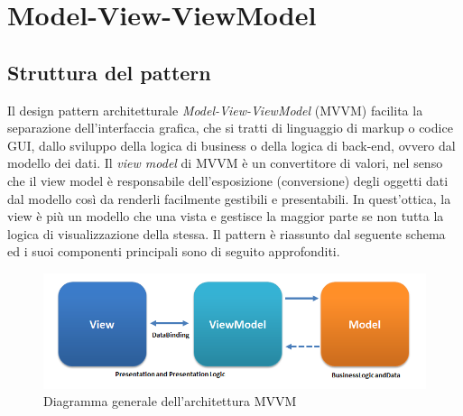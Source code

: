 \documentclass[openany,12pt,a4paper]{report}
\begin{document}
	\appendix
	
	\chapter{Model-View-ViewModel}
	
	\section{Struttura del pattern}
	
	Il design pattern architetturale \textit{Model-View-ViewModel} (MVVM) facilita la separazione dell'interfaccia grafica, che si tratti di linguaggio di markup o codice GUI, dallo sviluppo della logica di business o della logica di back-end, ovvero dal modello dei dati. Il \textit{view model} di MVVM è un convertitore di valori, nel senso che il view model è responsabile dell'esposizione (conversione) degli oggetti dati dal modello così da renderli facilmente gestibili e presentabili. In quest'ottica, la view è più un modello che una vista e gestisce la maggior parte se non tutta la logica di visualizzazione della stessa. Il pattern è riassunto dal seguente schema ed i suoi componenti principali sono di seguito approfonditi.
	
	\begin{figure}[H]
		\includegraphics[scale=0.7]{MVVMPattern}
		\centering
		\caption{Diagramma generale dell'architettura MVVM}
	\end{figure}
	
\end{document}
